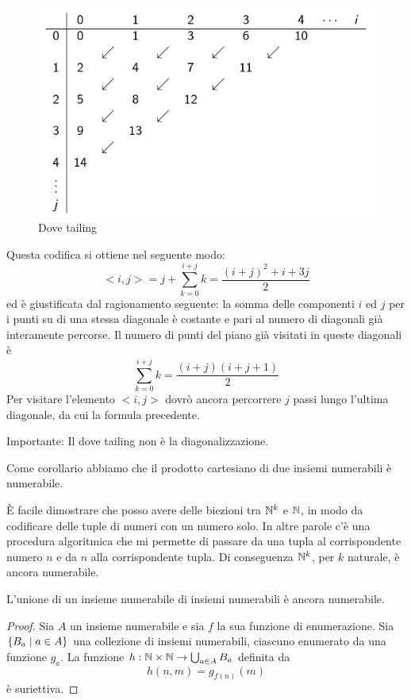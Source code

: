 \begin{figure}[h]
    \centering
    \includegraphics[scale=0.5]{img/DoveTailing.jpg}
    \caption{Dove tailing}
\end{figure}

Questa codifica si ottiene nel seguente modo:
\begin{equation*}
    <i,j> = j + \sum_{k=0}^{i+j}k = \frac{(i+j)^{2}+i+3j}{2}
\end{equation*}
ed è giustificata dal ragionamento seguente: la somma delle componenti $i$ ed $j$ per i punti su di una
stessa diagonale è costante e pari al numero di diagonali già interamente percorse. Il numero di
punti del piano già visitati in queste diagonali è
\begin{equation*}
    \sum_{k=0}^{i+j}k = \frac{(i+j)(i+j+1)}{2}
\end{equation*}
Per visitare l'elemento $<i,j>$ dovrò ancora percorrere $j$ passi lungo l'ultima diagonale, da cui
la formula precedente.

Importante: Il dove tailing non è la diagonalizzazione.

Come corollario abbiamo che il prodotto cartesiano di due insiemi numerabili è numerabile.

È facile dimostrare che posso avere delle biezioni tra $\mathbb{N}^{k}$ e $\mathbb{N}$, in modo da codificare
delle tuple di numeri con un numero solo. In altre parole c'è una procedura algoritmica che mi
permette di passare da una tupla al corrispondente numero $n$ e da $n$ alla corrispondente tupla. Di
conseguenza $\mathbb{N}^{k}$, per $k$ naturale, è ancora numerabile.

\begin{lem}
    L'unione di un insieme numerabile di insiemi numerabili è ancora numerabile.
\end{lem}
\begin{proof}
    Sia $A$ un insieme numerabile e sia $f$ la sua funzione di enumerazione. Sia $\{B_{a}\mid a
    \in A\}$ una collezione di insiemi numerabili, ciascuno enumerato da una funzione $g_{a}$. La funzione
    $h : \mathbb{N} \times \mathbb{N} \to \bigcup_{a \in A}B_{a}$ definita da
    \begin{equation*}
        h(n,m) = g_{f(n)}(m)
    \end{equation*}
    è suriettiva.
\end{proof}

